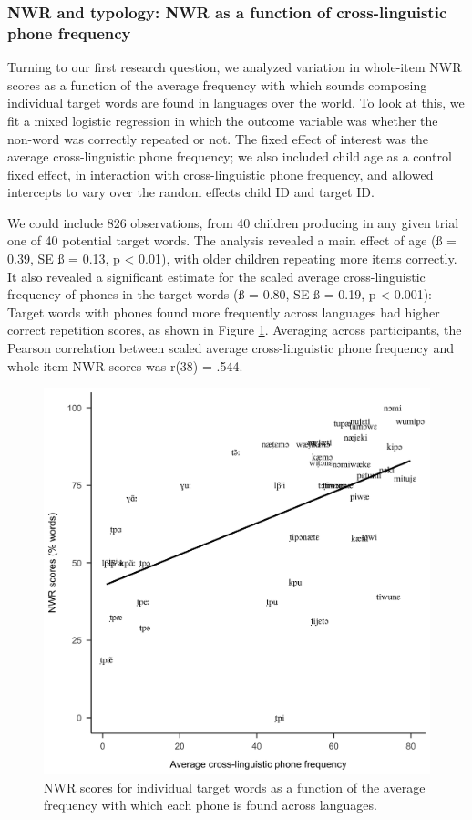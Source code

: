 \documentclass[
  american,
  ,man,floatsintext]{apa6}
\begin{document}
\hypertarget{nwr-and-typology-nwr-as-a-function-of-cross-linguistic-phone-frequency}{%
\subsubsection{NWR and typology: NWR as a function of cross-linguistic phone frequency}\label{nwr-and-typology-nwr-as-a-function-of-cross-linguistic-phone-frequency}}

Turning to our first research question, we analyzed variation in whole-item NWR scores as a function of the average frequency with which sounds composing individual target words are found in languages over the world. To look at this, we fit a mixed logistic regression in which the outcome variable was whether the non-word was correctly repeated or not. The fixed effect of interest was the average cross-linguistic phone frequency; we also included child age as a control fixed effect, in interaction with cross-linguistic phone frequency, and allowed intercepts to vary over the random effects child ID and target ID.

We could include 826 observations, from 40 children producing in any given trial one of 40 potential target words. The analysis revealed a main effect of age (ß = 0.39, SE ß = 0.13, p \textless{} 0.01), with older children repeating more items correctly. It also revealed a significant estimate for the scaled average cross-linguistic frequency of phones in the target words (ß = 0.80, SE ß = 0.19, p \textless{} 0.001): Target words with phones found more frequently across languages had higher correct repetition scores, as shown in Figure \ref{fig:fig-xling-freq}. Averaging across participants, the Pearson correlation between scaled average cross-linguistic phone frequency and whole-item NWR scores was r(38) = .544.

\begin{figure}[!t]

{\centering \includegraphics[width=0.65\linewidth]{nwr.by.freq.ITEM} 

}

\caption{NWR scores for individual target words as a function of the average frequency with which each phone is found across languages.}\label{fig:fig-xling-freq}
\end{figure}
\end{document}
